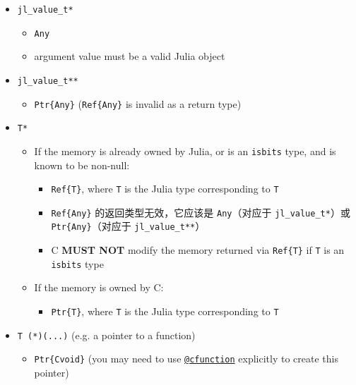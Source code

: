 \begin{itemize}
\begin{itemize}
\end{itemize}

\item \texttt{jl\_value\_t*}

\begin{itemize}
\item \texttt{Any}


\item argument value must be a valid Julia object

\end{itemize}

\item \texttt{jl\_value\_t**}

\begin{itemize}
\item \texttt{Ptr\{Any\}} (\texttt{Ref\{Any\}} is invalid as a return type)

\end{itemize}

\item \texttt{T*}

\begin{itemize}
\item If the memory is already owned by Julia, or is an \texttt{isbits} type, and is known to be non-null:

\begin{itemize}
\item \texttt{Ref\{T\}}, where \texttt{T} is the Julia type corresponding to \texttt{T}


\item \texttt{Ref\{Any\}} 的返回类型无效，它应该是 \texttt{Any}（对应于 \texttt{jl\_value\_t*}）或 \texttt{Ptr\{Any\}}（对应于 \texttt{jl\_value\_t**}）


\item C \textbf{MUST NOT} modify the memory returned via \texttt{Ref\{T\}} if \texttt{T} is an \texttt{isbits} type

\end{itemize}

\item If the memory is owned by C:

\begin{itemize}
\item \texttt{Ptr\{T\}}, where \texttt{T} is the Julia type corresponding to \texttt{T}

\end{itemize}
\end{itemize}

\item \texttt{T (*)(...)} (e.g. a pointer to a function)

\begin{itemize}
\item \texttt{Ptr\{Cvoid\}} (you may need to use \hyperlink{11617107520401351255}{\texttt{@cfunction}} explicitly to create this pointer)

\end{itemize}
\end{itemize}


